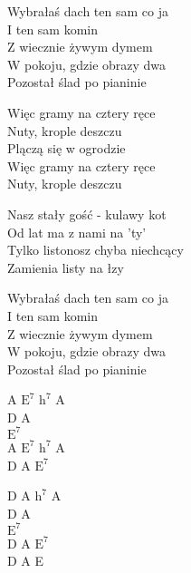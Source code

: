 
\begin{text}
    Wybrałaś dach ten sam co ja\\
    I ten sam komin\\
    Z wiecznie żywym dymem\\
    W pokoju, gdzie obrazy dwa\\
    Pozostał ślad po pianinie

    \vin Więc gramy na cztery ręce\\
    \vin Nuty, krople deszczu\\
    \vin Plączą się w ogrodzie\\
    \vin Więc gramy na cztery ręce\\
    \vin Nuty, krople deszczu

    Nasz stały gość - kulawy kot\\
    Od lat ma z nami na 'ty'\\
    Tylko listonosz chyba niechcący\\
    Zamienia listy na łzy

    Wybrałaś dach ten sam co ja\\
    I ten sam komin\\
    Z wiecznie żywym dymem\\
    W pokoju, gdzie obrazy dwa\\
    Pozostał ślad po pianinie
\end{text}
\begin{chord}
    A $\mathrm{E^7}$ $\mathrm{h^7}$ A\\
    D A\\
    $\mathrm{E^7}$\\
    A $\mathrm{E^7}$ $\mathrm{h^7}$ A\\
    D A $\mathrm{E^7}$

    D A $\mathrm{h^7}$ A\\
    D A\\
    $\mathrm{E^7}$\\
    D A $\mathrm{E^7}$\\
    D A E
\end{chord}
